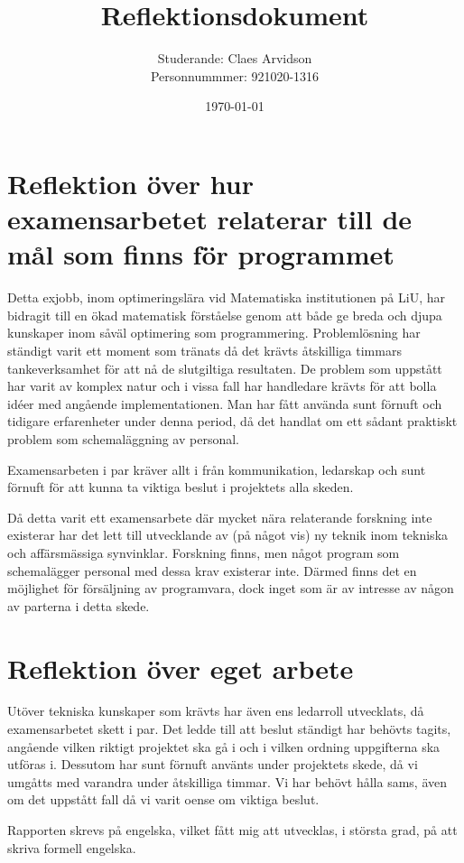 \documentclass{article}
\title{Reflektionsdokument}
\author{Studerande: Claes Arvidson \\ Personnummmer: 921020-1316}
\date{\today}
\begin{document}
 
\maketitle

 
\section*{Reflektion över hur examensarbetet relaterar till de mål som finns för programmet}
Detta exjobb, inom optimeringslära vid Matematiska institutionen på LiU, har bidragit till en ökad matematisk förståelse genom att både ge breda och djupa kunskaper inom såväl optimering som programmering. Problemlösning har ständigt varit ett moment som tränats då det krävts åtskilliga timmars tankeverksamhet för att nå de slutgiltiga resultaten. De problem som uppstått har varit av komplex natur och i vissa fall har handledare krävts för att bolla idéer med angående implementationen. Man har fått använda sunt förnuft och tidigare erfarenheter under denna period, då det handlat om ett sådant praktiskt problem som schemaläggning av personal.

Examensarbeten i par kräver allt i från kommunikation, ledarskap och sunt förnuft för att kunna ta viktiga beslut i projektets alla skeden.

Då detta varit ett examensarbete där mycket nära relaterande forskning inte existerar har det lett till utvecklande av (på något vis) ny teknik inom tekniska och affärsmässiga synvinklar. Forskning finns, men något program som schemalägger personal med dessa krav existerar inte. Därmed finns det en möjlighet för försäljning av programvara, dock inget som är av intresse av någon av parterna i detta skede. 



 

\section*{Reflektion över eget arbete}
Utöver tekniska kunskaper som krävts har även ens ledarroll utvecklats, då examensarbetet skett i par. Det ledde till att beslut ständigt har behövts tagits, angående vilken riktigt projektet ska gå i och i vilken ordning uppgifterna ska utföras i. Dessutom har sunt förnuft använts under projektets skede, då vi umgåtts med varandra under åtskilliga timmar. Vi har behövt hålla sams, även om det uppstått fall då vi varit oense om viktiga beslut.

Rapporten skrevs på engelska, vilket fått mig att utvecklas, i största grad, på att skriva formell engelska.
\end{document}
